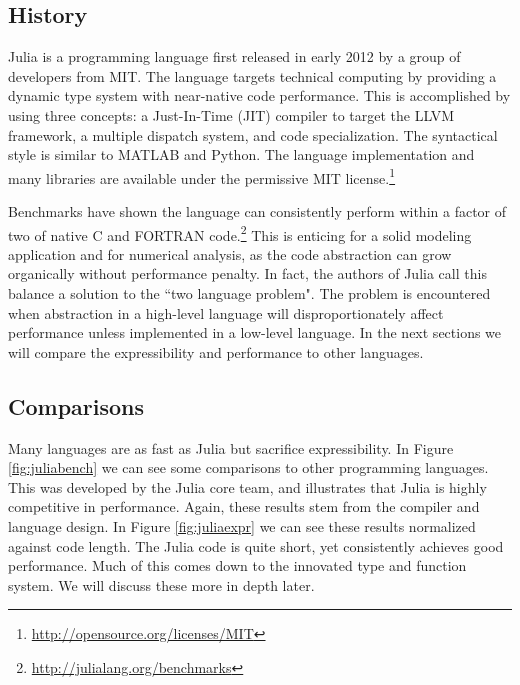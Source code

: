 \documentclass[a4paper]{article}
\begin{document}
\subsection{History}
Julia is a programming language first released in early 2012 by a group of
developers from MIT. The language targets technical computing by providing a
dynamic type system with near-native code performance. This is accomplished by
using three concepts: a Just-In-Time (JIT) compiler to target the LLVM framework,
a multiple dispatch system, and code specialization.\cite{bezanson2012julia}
\cite{Bezanson_Edelman_Karpinski_Shah_2014}
The syntactical style is similar to MATLAB and Python.
The language implementation and many libraries are available under the
permissive MIT license.\footnote{\url{http://opensource.org/licenses/MIT}}

Benchmarks have shown the language can consistently perform within a factor of
two of native C and FORTRAN code.\footnote{\url{http://julialang.org/benchmarks}}
This is enticing for a solid modeling application and for numerical analysis,
as the code abstraction can grow organically without performance penalty.
In fact, the authors of Julia call this balance a solution to the 
``two language problem". The problem is encountered when abstraction in a
high-level language will disproportionately affect performance unless
implemented in a low-level language. In the next sections we will compare
the expressibility and performance to other languages.

\subsection{Comparisons}

Many languages are as fast as Julia but sacrifice expressibility.
In Figure \ref{fig:juliabench} we can see some comparisons to other programming
languages. This was developed by the Julia core team, and illustrates that
Julia is highly competitive in performance. Again, these results stem from
the compiler and language design. In Figure \ref{fig:juliaexpr} we can see
these results normalized against code length. The Julia code is quite short,
yet consistently achieves good performance.
Much of this comes down to the innovated type and function system. We will
discuss these more in depth later.
\end{document}
